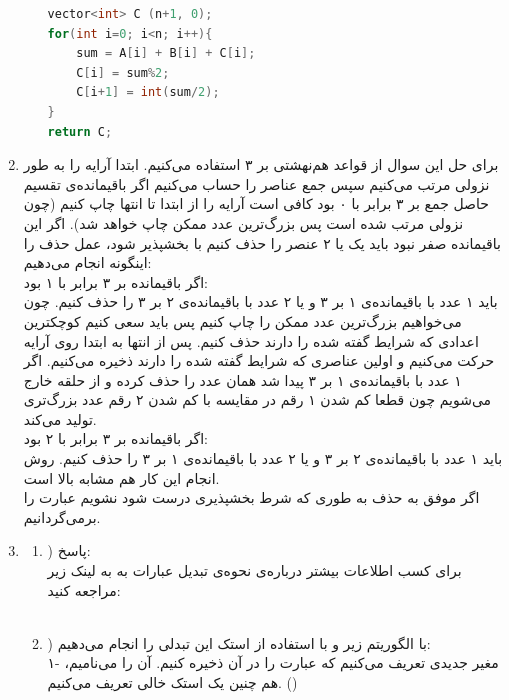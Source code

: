 \documentclass{article}
\begin{document}
\begin{enumerate}
\begin{enumerate}
\begin{latin}
\begin{flushright}
\begin{lstlisting}[language=C++]
vector<int> C (n+1, 0);
for(int i=0; i<n; i++){
	sum = A[i] + B[i] + C[i]; 
	C[i] = sum%2; 
	C[i+1] = int(sum/2);
}
return C;
\end{lstlisting}
\end{flushright}								
\end{latin}
	\end{enumerate}
	\item برای حل این سوال از قواعد هم‌نهشتی بر ۳ استفاده می‌کنیم. ابتدا آرایه را به طور نزولی مرتب می‌کنیم سپس جمع عناصر را حساب می‌کنیم اگر باقیمانده‌ی تقسیم حاصل جمع بر ۳ برابر با ۰ بود کافی است آرایه را از ابتدا تا انتها چاپ کنیم (چون نزولی مرتب شده است پس بزرگ‌ترین عدد ممکن چاپ خواهد شد). اگر این باقیمانده صفر نبود باید یک یا ۲ عنصر را حذف کنیم با بخشپذیر شود، عمل حذف را اینگونه انجام می‌دهیم:\\
	\lr{-} اگر باقیمانده بر ۳ برابر با ۱ بود:\\
	باید ۱ عدد با باقیمانده‌ی ۱ بر ۳ و یا ۲ عدد با باقیمانده‌ی ۲ بر ۳ را حذف کنیم. چون می‌خواهیم بزرگ‌ترین عدد ممکن را چاپ کنیم پس باید سعی کنیم کوچکترین اعدادی که شرایط گفته شده را دارند حذف کنیم. پس از انتها به ابتدا روی آرایه حرکت می‌کنیم و  اولین عناصری که شرایط گفته شده را دارند ذخیره می‌کنیم. اگر ۱ عدد با باقیمانده‌ی ۱ بر ۳ پیدا شد همان عدد را حذف کرده و از حلقه خارج می‌شویم چون قطعا کم شدن ۱ رقم در مقایسه با کم شدن ۲ رقم عدد بزرگ‌تری تولید می‌کند. \\
	\lr{-} اگر باقیمانده بر ۳ برابر با ۲ بود:\\
	باید ۱ عدد با باقیمانده‌ی ۲ بر ۳ و یا ۲ عدد با باقیمانده‌ی ۱ بر ۳ را حذف کنیم. روش انجام این کار هم مشابه بالا است.\\
	اگر موفق به حذف به طوری که شرط بخشپذیری درست شود نشویم عبارت  را برمی‌گردانیم.
	\item 
	\begin{enumerate}
		\item) پاسخ:  \\
		برای کسب اطلاعات بیشتر درباره‌ی نحوه‌ی تبدیل عبارات  به  به لینک زیر مراجعه کنید: \\
		\\
		\item) با الگوریتم زیر و با استفاده از استک این تبدلی را انجام می‌دهیم:\\
		۱- مغیر جدیدی تعریف می‌کنیم که عبارت  را در آن ذخیره کنیم. آن را  می‌نامیم، هم چنین یک استک خالی تعریف می‌کنیم. ()\\

\end{enumerate}
\end{enumerate}
\end{document}
